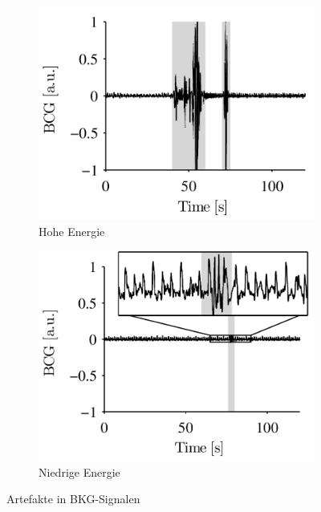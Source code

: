 	\begin{figure}[H]
		\centering
		\begin{subfigure}{0.48\linewidth}
			\centering
      		\includegraphics[width=\textwidth]{pic/high-energy-artifacts.png}
			\caption{Hohe Energie}
			\label{fig:high-energy-artifact}
    	\end{subfigure}
    	\hfill
    	\begin{subfigure}{0.48\linewidth}
    		\centering
      		\includegraphics[width=\textwidth]{pic/low-energy-artifacts.png}
			\caption{Niedrige Energie}
			\label{fig:low-energy-artifact}
    	\end{subfigure}
    	\caption{Artefakte in \ac{BKG}-Signalen}
	\end{figure}
	

